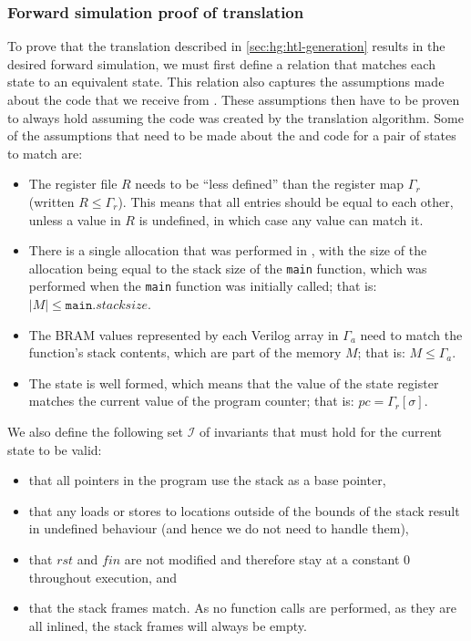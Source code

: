 \subsubsection{Forward simulation proof of translation}

To prove that the translation described in \cref{sec:hg:htl-generation} results
in the desired forward simulation, we must first define a relation that matches
each \rtlsubpar{} state to an equivalent \htl{} state.  This relation also
captures the assumptions made about the \rtlsubpar{} code that we receive from
\compcert{}.  These assumptions then have to be proven to always hold assuming
the \htl{} code was created by the translation algorithm.  Some of the
assumptions that need to be made about the \rtlsubpar{} and \htl{} code for a
pair of states to match are:

\begin{itemize}
\item The \rtlsubpar{} register file $R$ needs to be \enquote{less defined} than
  the \htl{} register map $\Gamma_{r}$ (written $R \le \Gamma_{r}$). This means
  that all entries should be equal to each other, unless a value in $R$ is
  undefined, in which case any value can match it.
\item There is a single allocation that was performed in \rtlsubpar{}, with the
  size of the allocation being equal to the stack size of the \texttt{main}
  function, which was performed when the \texttt{main} function was initially
  called; that is: $|M| \le \mathtt{main}.\mathit{stacksize}$.
\item The \gls{BRAM} values represented by each Verilog array in $\Gamma_{a}$ need to
  match the \rtlsubpar{} function's stack contents, which are part of the memory $M$;
  that is: $M \le \Gamma_{a}$.
\item The state is well formed, which means that the value of the state register
  matches the current value of the program counter; that is:
  $\mathit{pc} = \Gamma_{r}[\sigma]$.
\end{itemize}

We also define the following set $\mathcal{I}$ of invariants that must hold for
the current state to be valid:

\begin{itemize}
\item that all pointers in the program use the stack as a base pointer,
\item that any loads or stores to locations outside of the bounds of the stack
  result in undefined behaviour (and hence we do not need to handle them),
\item that $\mathit{rst}$ and $\mathit{fin}$ are not modified and therefore stay
  at a constant 0 throughout execution, and
\item that the stack frames match.  As no function calls are performed, as they
  are all inlined, the stack frames will always be empty.
\end{itemize}

